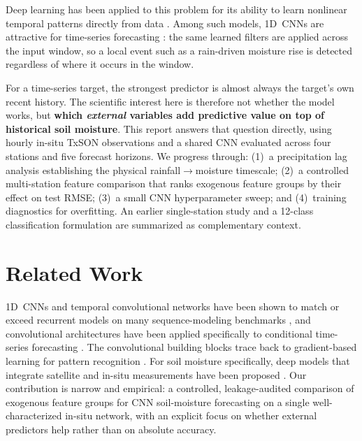 \documentclass[11pt]{article}
\begin{document}
Deep learning has been applied to this problem for its ability to learn
nonlinear temporal patterns directly from data \cite{liu2022multiscale}. Among
such models, 1D~CNNs are attractive for time-series forecasting
\cite{borovykh2017conditional, bai2018empirical}: the same learned filters are
applied across the input window, so a local event such as a rain-driven moisture
rise is detected regardless of where it occurs in the window.

For a time-series target, the strongest predictor is almost always the target's
own recent history. The scientific interest here is therefore not whether the
model works, but \textbf{which \emph{external} variables add predictive value on
top of historical soil moisture}. This report answers that question directly,
using hourly in-situ TxSON observations and a shared CNN evaluated across four
stations and five forecast horizons. We progress through: (1)~a precipitation
lag analysis establishing the physical rainfall$\rightarrow$moisture timescale;
(2)~a controlled multi-station feature comparison that ranks exogenous feature
groups by their effect on test RMSE; (3)~a small CNN hyperparameter sweep; and
(4)~training diagnostics for overfitting. An earlier single-station study and a
12-class classification formulation are summarized as complementary context.

\section{Related Work}

1D~CNNs and temporal convolutional networks have been shown to match or exceed
recurrent models on many sequence-modeling benchmarks \cite{bai2018empirical},
and convolutional architectures have been applied specifically to conditional
time-series forecasting \cite{borovykh2017conditional}. The convolutional
building blocks trace back to gradient-based learning for pattern recognition
\cite{lecun1998gradient}. For soil moisture specifically, deep models that
integrate satellite and in-situ measurements have been proposed
\cite{liu2022multiscale}. Our contribution is narrow and empirical: a controlled,
leakage-audited comparison of exogenous feature groups for CNN soil-moisture
forecasting on a single well-characterized in-situ network, with an explicit
focus on whether external predictors help rather than on absolute accuracy.
\end{document}
